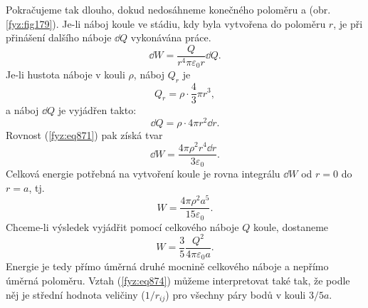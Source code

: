     Pokračujeme tak dlouho, dokud nedosáhneme konečného poloměru a (obr. \ref{fyz:fig179}). Je-li
    náboj koule ve stádiu, kdy byla vytvořena do poloměru \(r\), je při přinášení dalšího náboje
    \(\dd{Q}\) vykonávána práce.
    \begin{equation}\label{fyz:eq871}
      \dd{W}=\dfrac{Q}{r^4π\varepsilon_0r}\dd{Q}.
    \end{equation}
    Je-li hustota náboje v kouli \(ρ\), náboj \(Q_r\) je
    \begin{equation*}
      Q_r=ρ\cdot\dfrac{4}{3}πr^3,
    \end{equation*}
    a náboj \(\dd{Q}\) je vyjádřen takto:
    \begin{equation*}
      \dd{Q}=ρ⋅4πr^2\dd{r}.
    \end{equation*}
    Rovnost (\ref{fyz:eq871}) pak získá tvar
    \begin{equation}\label{fyz:eq872}
      \dd{W}=\dfrac{4πρ^2r^4\dd{r}}{3\varepsilon_0}.
    \end{equation}
    Celková energie potřebná na vytvoření koule je rovna integrálu \(\dd{W}\) od \(r = 0\) do \(r =
    a\), tj.
    \begin{equation}\label{fyz:eq873}
      W=\dfrac{4πρ^2a^5}{15\varepsilon_0}.
    \end{equation}
    Chceme-li výsledek vyjádřit pomocí celkového náboje \(Q\) koule, dostaneme
    \begin{equation}\label{fyz:eq874}
      W=\dfrac{3}{5}\dfrac{Q^2}{4π\varepsilon_0a}.
    \end{equation}
    Energie je tedy přímo úměrná druhé mocnině celkového náboje a nepřímo úměrná poloměru. Vztah
    (\ref{fyz:eq874}) můžeme interpretovat také tak, že podle něj je střední hodnota veličiny
    (\(1/r_{ij}\)) pro všechny páry bodů v kouli \(3/5 a\).


